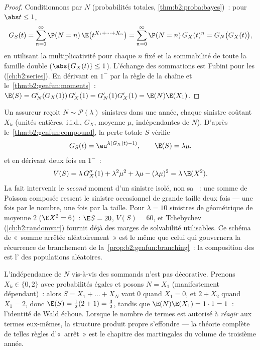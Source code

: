 \begin{proof}
Conditionnons par $N$ (probabilités totales,
\cref{thm:b2:proba:bayes})~: pour $\abs t \leq 1$,
\[
G_S(t) = \sum_{n=0}^\infty \P(N = n)\,
\E\bigl(t^{X_1 + \dots + X_n}\bigr)
= \sum_{n=0}^\infty \P(N = n)\,G_X(t)^n
= G_N\bigl(G_X(t)\bigr),
\]
en utilisant la multiplicativité pour chaque $n$ fixé et la
sommabilité de toute la famille double ($\abs{G_X(t)} \leq 1$).
L'échange des sommations est Fubini pour les 
(\cref{ch:b2:series}). En dérivant en $1^-$ par la règle de la
chaîne et le~\cref{thm:b2:genfun:moments}~: $\E(S) = G_N'(G_X(1))\,G_X'(1)
= G_N'(1)G_X'(1) = \E(N)\E(X_1)$.
\end{proof}

\begin{example}\label{ex:b2:genfun:compoundpoisson}
Un assureur reçoit $N \sim \mathcal P(\lambda)$ sinistres dans une
année, chaque sinistre coûtant $X_k$ (unités entières, i.i.d.,  $G_X$, moyenne $\mu$, indépendantes de $N$). D'après le~\cref{thm:b2:genfun:compound}, la perte totale $S$ vérifie
\[
G_S(t) = \eu^{\lambda(G_X(t) - 1)},
\qquad
\E(S) = \lambda\mu ,
\]
et en dérivant deux fois en $1^-$~:
\[
V(S) = \lambda\,G_X''(1) + \lambda^2\mu^2 + \lambda\mu -
(\lambda\mu)^2 = \lambda\,\E(X^2) .
\]
La  fait intervenir le \emph{second} moment d'un
sinistre isolé, non sa ~: une somme de Poisson composée
ressent le sinistre occasionnel de grande taille deux fois --- une
fois par le nombre, une fois par la taille. Pour $\lambda = 10$
sinistres de  géométrique de moyenne $2$ ($\E X^2 = 6$)~: $\E S =
20$, $V(S) = 60$, et Tchebychev (\cref{ch:b2:randomvar}) fournit
déjà des marges de solvabilité utilisables. Ce schéma de «~somme
arrêtée aléatoirement~» est le même que celui qui gouvernera la
récurrence de branchement de la~\cref{prop:b2:genfun:branching}~: la
composition des  est l' des populations
aléatoires.
\end{example}

\begin{remark}
L'indépendance de $N$ vis-à-vis des sommands n'est pas décorative.
Prenons $X_k \in \{0, 2\}$ avec probabilités égales et posons $N =
X_1$ (manifestement dépendant)~: alors $S = X_1 + \dots + X_N$ vaut
$0$ quand $X_1 = 0$, et $2 + X_2$ quand $X_1 = 2$, donc $\E(S) =
\frac12(2 + 1) = \frac32$, tandis que $\E(N)\E(X_1) = 1\cdot1 =
1$~: l'identité de Wald échoue. Lorsque le nombre de termes est
autorisé à \emph{réagir} aux termes eux-mêmes, la structure produit
propre s'effondre --- la théorie complète de telles règles
d'«~arrêt~» est le chapitre des martingales du volume de troisième
année.
\end{remark}

